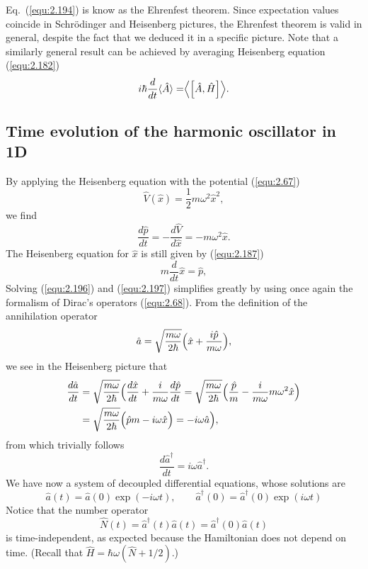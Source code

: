  Eq.~(\ref{equ:2.194}) is know as the Ehrenfest theorem.
 Since expectation values coincide in Schrödinger and
 Heisenberg pictures, the Ehrenfest theorem is valid in
 general, despite the fact that we deduced it in a specific
 picture. Note that a similarly general result can be
 achieved by averaging Heisenberg equation (\ref{equ:2.182})
 \begin{equation}
   i\hbar \frac{d}{dt} \langle \hat{A} \rangle = \Bigr\langle
   \Bigl[\hat{A}, \hat{H}\Bigr] \Bigr\rangle.
   \label{equ:2.195}
 \end{equation}
 \subsection*{Time evolution of the harmonic oscillator in
 1D}
 By applying the Heisenberg equation with the potential
 (\ref{equ:2.67})
 \[\hat{V}(\hat{x}) = \frac{1}{2}m\omega^2 \hat{x}^2,\]
 we find
 \begin{equation}
   \frac{d\hat{p}}{dt} = - \frac{d\hat{V}}{d\hat{x}} = -
   m\omega^2 \hat{x}.
   \label{equ:2.196}
 \end{equation}
 The Heisenberg equation for $\hat{x}$ is still given by
 (\ref{equ:2.187})
 \begin{equation}
   m \frac{d}{dt} \hat{x} = \hat{p},
   \label{equ:2.197}
 \end{equation}
 Solving (\ref{equ:2.196}) and (\ref{equ:2.197}) simplifies
 greatly by using once again the formalism of Dirac's
 operators (\ref{equ:2.68}). From the definition of the
 annihilation operator
 \[\hat{a} = 
 \sqrt{\frac{m\omega}{2\hbar}}\Bigl(\hat{x}+\frac{i\hat{p}}{m\omega}\Bigr), \]
 we see in the Heisenberg picture that
 \begin{align}
   \frac{d\hat{a}}{dt} &= \sqrt{\frac{m\omega}{2\hbar}}
   \Bigl(
   \frac{d\hat{x}}{dt} +
   \frac{i}{m\omega}\frac{d\hat{p}}{dt} =
   \sqrt{\frac{m\omega}{2\hbar}}\Bigl(\frac{\hat{p}}{m}-\frac{i}{m\omega}m\omega^2\hat{x}\Bigr)
   \nonumber\\
   &=
   \sqrt{\frac{m\omega}{2\hbar}}\Bigl(\hat{p}{m}-i\omega\hat{x}\Bigr)
   = -i\omega \hat{a}   \Bigr),\label{equ:2.198}
 \end{align}
from which trivially follows
\begin{equation}
  \frac{d\hat{a}^{\dagger}}{dt} = i\omega \hat{a}^{\dagger}.
  \label{equ:2.199}
\end{equation}
We have now a system of decoupled differential equations,
whose solutions are
\begin{equation}
  \hat{a}(t) = \hat{a}(0) \exp(-i\omega t), \qquad
  \hat{a}^{\dagger}(0) = \hat{a}^{\dagger}(0) \exp(i\omega t)
  \label{equ:2.200}
\end{equation}
Notice that the number operator
\[\hat{N}(t) = \hat{a}^{\dagger}(t)\hat{a}(t) =
\hat{a}^{\dagger}(0)\hat{a}(t)\]
is time-independent, as expected because the Hamiltonian
does not depend on time. (Recall that $\hat{H} =
\hbar\omega(\hat{N}+1/2)$.)

